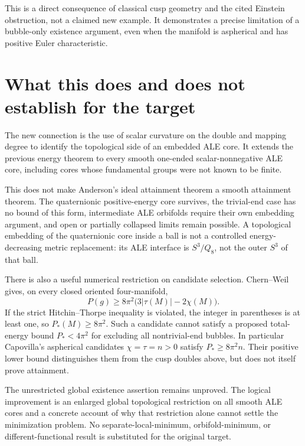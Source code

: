 \documentclass[11pt]{article}
\begin{document}
This is a direct consequence of classical cusp geometry and the cited
Einstein obstruction, not a claimed new example. It demonstrates a
precise limitation of a bubble-only existence argument, even when the
manifold is aspherical and has positive Euler characteristic.

\section{What this does and does not establish for the target}
The new connection is the use of scalar curvature on the double and
mapping degree to identify the topological side of an embedded ALE
core. It extends the previous energy theorem to every smooth
one-ended scalar-nonnegative ALE core, including cores whose
fundamental groups were not known to be finite.

This does not make Anderson's ideal attainment theorem
\cite[Theorem 4.10 and Remark 4.12]{Anderson} a smooth attainment
theorem. The quaternionic positive-energy core survives, the
trivial-end case has no bound of this form, intermediate ALE
orbifolds require their own embedding argument, and open or partially
collapsed limits remain possible. A topological embedding of the
quaternionic core inside a ball is not a controlled energy-decreasing
metric replacement: its ALE interface is $S^3/Q_8$, not the outer
$S^3$ of that ball.

There is also a useful numerical restriction on candidate selection.
Chern--Weil gives, on every closed oriented four-manifold,
\[
 P(g)\ge8\pi^2\bigl(3|\tau(M)|-2\chi(M)\bigr).
\]
If the strict Hitchin--Thorpe inequality is violated, the integer in
parentheses is at least one, so $P_*(M)\ge8\pi^2$. Such a candidate
cannot satisfy a proposed total-energy bound $P_*<4\pi^2$ for
excluding all nontrivial-end bubbles. In particular Capovilla's
aspherical candidates $\chi=\tau=n>0$ \cite{Capovilla} satisfy
$P_*\ge8\pi^2n$. Their positive lower bound distinguishes them from
the cusp doubles above, but does not itself prove attainment.

The unrestricted global existence assertion remains unproved.
The logical improvement is an enlarged global topological restriction
on all smooth ALE cores and a concrete account of why that restriction
alone cannot settle the minimization problem. No separate-local-minimum,
orbifold-minimum, or different-functional result is substituted for
the original target.
\end{document}
